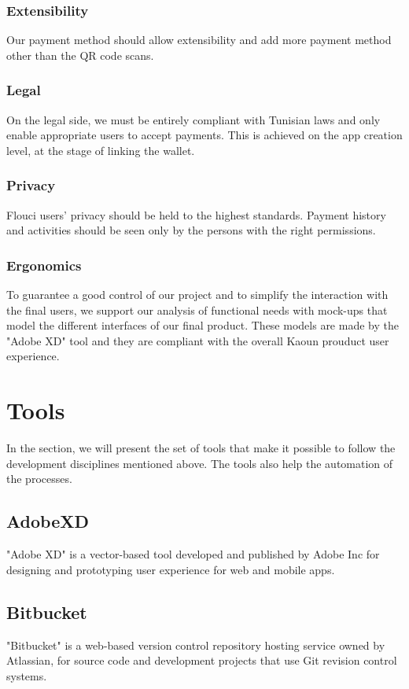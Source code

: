 \begin{spacing}{1.2}
\subsubsection{Extensibility}
Our payment method should allow extensibility and add more payment method other than the QR code scans. 
\subsubsection{Legal}
On the legal side, we must be entirely compliant with Tunisian laws and only enable appropriate users to accept payments.
This is achieved on the app creation level, at the stage of linking the wallet.
\subsubsection{Privacy}
Flouci users' privacy should be held to the highest standards. Payment history and activities should be seen only by the persons with the right permissions.
\subsubsection{Ergonomics}
To guarantee a good control of our project and to simplify the interaction with the final users, we support our analysis of functional needs with mock-ups that model the different interfaces of our final product. These models are made by the "Adobe XD" tool and they are compliant with the overall Kaoun prouduct user experience. 

\section{Tools}
In the section, we will present the set of tools that make it possible to follow the development disciplines mentioned above. The tools also help the automation of the processes.
\subsection{AdobeXD}
"Adobe XD"\cite{AdobeXD} is a vector-based tool developed and published by Adobe Inc for designing and prototyping user experience for web and mobile apps.
\subsection{Bitbucket}
"Bitbucket"\cite{Bitbucket} is a web-based version control repository hosting service owned by Atlassian, for source code and development projects that use Git revision control systems.

\end{spacing}
